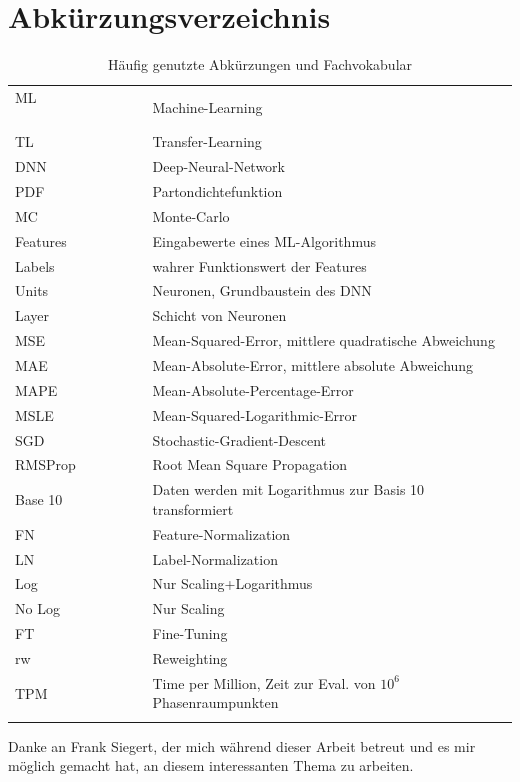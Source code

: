 \section{Abkürzungsverzeichnis}
\begin{table}[htp]
	\centering
	\begin{tabular}{ll}
		ML $\hspace{3cm}$& Machine-Learning \\
		TL & Transfer-Learning \\
		DNN & Deep-Neural-Network \\
		PDF & Partondichtefunktion \\
		MC & Monte-Carlo \\
		Features & Eingabewerte eines ML-Algorithmus \\
		Labels & wahrer Funktionswert der Features \\
		Units & Neuronen, Grundbaustein des DNN \\
		Layer & Schicht von Neuronen \\
		MSE & Mean-Squared-Error, mittlere quadratische Abweichung \\
		MAE & Mean-Absolute-Error, mittlere absolute Abweichung \\
		MAPE & Mean-Absolute-Percentage-Error\\
		MSLE & Mean-Squared-Logarithmic-Error \\
		SGD & Stochastic-Gradient-Descent\\
		RMSProp & Root Mean Square Propagation \\
		Base 10& Daten werden mit Logarithmus zur Basis 10 transformiert \\
		FN & Feature-Normalization \\
		LN & Label-Normalization \\
		Log & Nur Scaling+Logarithmus \\
		No Log & Nur Scaling\\
		FT & Fine-Tuning \\
		rw & Reweighting \\
		TPM & Time per Million, Zeit zur Eval. von $10^{6}$ Phasenraumpunkten \\
		&\\
	\end{tabular}
	\caption{Häufig genutzte Abkürzungen und Fachvokabular}
	\label{Abkürzungen}
\end{table}





\clearpage
\pagestyle{empty}
Danke an Frank Siegert, der mich während dieser Arbeit betreut und es mir möglich gemacht hat, an diesem interessanten Thema zu arbeiten. 

